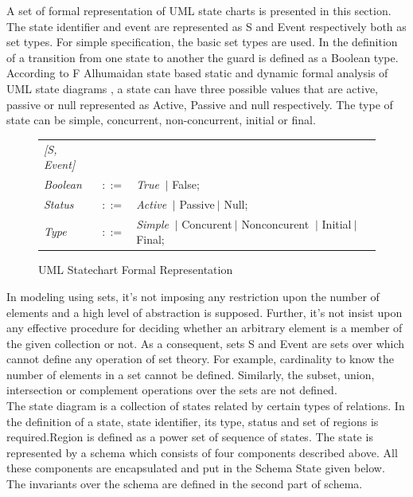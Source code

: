 A set of formal representation of UML state charts is presented in this section. The state identifier and event are represented as S and Event respectively both as set types. For simple specification, the basic set types are used. In the definition of a transition from one state to another the guard is defined as a Boolean type. According to F Alhumaidan state based static and dynamic formal analysis of UML state diagrams \cite{ref_16_alhumaidan2012state} , a state can have three possible values that are active, passive or null represented as Active, Passive and null respectively. The type of state can be simple, concurrent, non-concurrent, initial or final.

\begin{figure}[ht!]
	\centering
	\begin{tabular}{lll}
		\footnotesize                       
		\textit{[S, Event]}          &\footnotesize \\
		
		\footnotesize
		\textit{Boolean}            &\footnotesize $::=$         &\footnotesize \textit{True} $\ \vert $ {False};       \\   
		\footnotesize
		\textit{Status}            &\footnotesize $::=$         &\footnotesize \textit{Active}
		 $\ \vert $ {Passive}$\ \vert $ {Null};       \\ 
		\footnotesize
		\textit{Type}            &\footnotesize $::=$         &\footnotesize \textit{Simple}
		 	$\ \vert $ {Concurent}$\ \vert $ {Nonconcurent} $\ \vert $ {Initial}$\ \vert $ {Final};       \\	 	 
		
	\end{tabular}
	\caption{UML Statechart Formal Representation}
	\label{statechart_formal_representation}
\end{figure}

In modeling using sets, it's not imposing any restriction upon the number of elements and a high level of
abstraction is supposed. Further, it's not insist upon any
effective procedure for deciding whether an arbitrary
element is a member of the given collection or not. As a
consequent, sets S and Event are sets over which cannot define any operation of set theory. For example,
cardinality to know the number of elements in a set cannot
be defined. Similarly, the subset, union, intersection or
complement operations over the sets are not defined.\\

The state diagram is a collection of states related by
certain types of relations. In the definition of a state, state identifier, its type, status and set of regions is required.Region is defined as a power set of sequence of states. The state is represented by a schema which consists of four components described above. All these components are encapsulated and put in the Schema State given below.
The invariants over the schema are defined in the second
part of schema.\\

